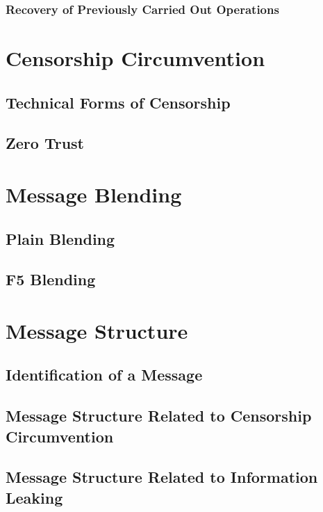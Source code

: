 \subsection{Recovery of Previously Carried Out Operations}

\chapter{Censorship Circumvention}
\section{Technical Forms of Censorship}
\section{Zero Trust}

\chapter{Message Blending}
\section{Plain Blending}
\section{F5 Blending}

\chapter{Message Structure}
\section{Identification of a Message}
\section{Message Structure Related to Censorship Circumvention}
\section{Message Structure Related to Information Leaking}


